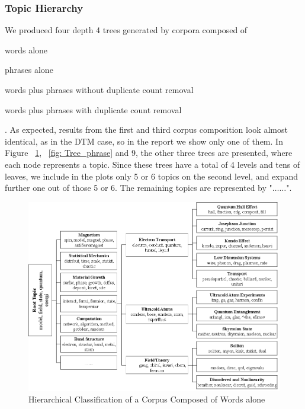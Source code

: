 \documentclass[DIV=calc, paper=letter, fontsize=10pt, twocolumn]{scrartcl}	 %
\begin{document}
\subsubsection*{Topic Hierarchy}
 We produced four depth 4 trees generated by corpora composed of
 \begin{inparaenum}
 \item  words alone
 \item phrases alone
 \item words plus phrases without duplicate count removal
 \item words plus phrases with duplicate count removal
 \end{inparaenum}.\newline \newline
As expected, results from the first and third corpus composition look almost identical, as in the DTM case, so in the report we show only one of them. In Figure ~\ref{fig: Tree_words}, ~\ref{fig: Tree_phrase} and 9, the other three trees are presented, where each node represents a topic. Since these trees have a total of 4 levels and tens of leaves, we include in the plots only 5 or 6 topics on the second level, and expand further one out of those 5 or 6. The remaining topics are represented by "$\ldots \ldots$". 
\begin{figure}[!ht]
	\centerline{\includegraphics[scale = 0.75]{tree_words.eps}}
	\caption{Hierarchical Classification of a Corpus Composed of Words alone}
	 \label{fig: Tree_words}
\end{figure}
\newpage
\end{document}
